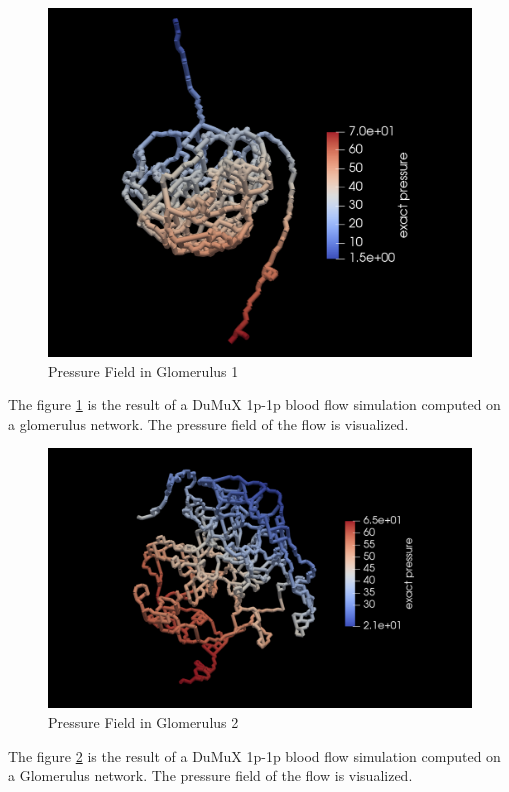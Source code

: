 \begin{figure}[h]
\centering
\includegraphics[width=162mm]{glom_pressure}
\caption{Pressure Field in Glomerulus 1}
\label{fig:glom_pressure}
\end{figure}
The figure \ref{fig:glom_pressure} is the result of a DuMuX 1p-1p blood flow simulation computed on a glomerulus network. The pressure field of the flow is visualized.\\

\begin{figure}[h]
\centering
\includegraphics[width=162mm]{glom2_pressure}
\caption{Pressure Field in Glomerulus 2}
\label{fig:glom2_pressure}
\end{figure}
The figure \ref{fig:glom2_pressure} is the result of a DuMuX 1p-1p blood flow simulation computed on a Glomerulus network. The pressure field of the flow is visualized.\\

